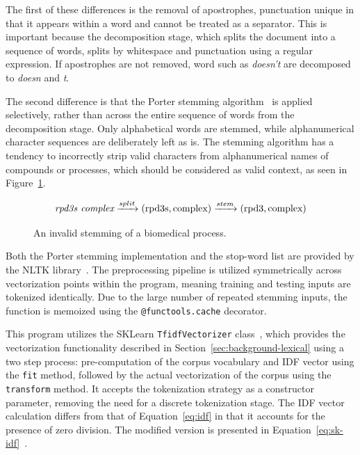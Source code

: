 \documentclass[11pt]{article}
\theoremstyle{plain}
\theoremstyle{definition}
\begin{document}
The first of these differences is the removal of apostrophes, punctuation unique in that it appears within a word and cannot be treated as a separator. This is important because the decomposition stage, which splits the document into a sequence of words, splits by whitespace and punctuation using a regular expression. If apostrophes are not removed, word such as \textit{doesn't} are decomposed to \textit{doesn} and \textit{t}.

The second difference is that the Porter stemming algorithm~\cite{porter/1980/algorithm}  is applied selectively, rather than across the entire sequence of words from the decomposition stage. Only alphabetical words are stemmed, while alphanumerical character sequences are deliberately left as is. The stemming algorithm has a tendency to incorrectly strip valid characters from alphanumerical names of compounds or processes, which should be considered as valid context, as seen in Figure~\ref{fig:invalid-stem}.

\begin{figure}[H]
    \centering
    \[\textit{rpd3s complex} \xrightarrow {split} (\textnormal{rpd3s}, \textnormal{complex}) \xrightarrow {stem}  (\textnormal{rpd3}, \textnormal{complex})\]
    \caption{An invalid stemming of a biomedical process.}\label{fig:invalid-stem}
\end{figure}

Both the Porter stemming implementation and the stop-word list are provided by the NLTK library~\cite{loper/2009/natural}. The preprocessing pipeline is utilized symmetrically across vectorization points within the program, meaning training and testing inputs are tokenized identically. Due to the large number of repeated stemming inputs, the function is memoized using the \verb|@functools.cache| decorator.

This program utilizes the SKLearn \verb|TfidfVectorizer| class~\cite{sklearn/2026/tfidfvectorizer}, which provides the vectorization functionality described in Section~\ref{sec:background-lexical} using a two step process: pre-computation of the corpus vocabulary and IDF vector using the \verb|fit| method, followed by the actual vectorization of the corpus using the \verb|transform| method. It accepts the tokenization strategy as a constructor parameter, removing the need for a discrete tokenization stage. The IDF vector calculation differs from that of Equation~\ref{eq:idf} in that it accounts for the presence of zero division. The modified version is presented in Equation~\ref{eq:sk-idf}~\cite{sklearn/2026/tfidfvectorizer}.
\end{document}
